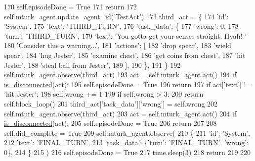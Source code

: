 \begin{DoxyCode}
170                 self.episodeDone = \textcolor{keyword}{True}
171                 \textcolor{keywordflow}{return}
172         self.mturk\_agent.update\_agent\_id(\textcolor{stringliteral}{'TestAct'})
173         third\_act = \{
174             \textcolor{stringliteral}{'id'}: \textcolor{stringliteral}{'System'},
175             \textcolor{stringliteral}{'text'}: \textcolor{stringliteral}{'THIRD\_TURN'},
176             \textcolor{stringliteral}{'task\_data'}: \{
177                 \textcolor{stringliteral}{'wrong'}: 0,
178                 \textcolor{stringliteral}{'turn'}: \textcolor{stringliteral}{'THIRD\_TURN'},
179                 \textcolor{stringliteral}{'text'}: \textcolor{stringliteral}{'You gotta get your senses straight. Hyah! '}
180                 \textcolor{stringliteral}{'Consider this a warning...'},
181                 \textcolor{stringliteral}{'actions'}: [
182                     \textcolor{stringliteral}{'drop spear'},
183                     \textcolor{stringliteral}{'wield spear'},
184                     \textcolor{stringliteral}{'hug Jester'},
185                     \textcolor{stringliteral}{'examine chest'},
186                     \textcolor{stringliteral}{'get coins from chest'},
187                     \textcolor{stringliteral}{'hit Jester'},
188                     \textcolor{stringliteral}{'steal ball from Jester'},
189                 ],
190             \},
191         \}
192         self.mturk\_agent.observe(third\_act)
193         act = self.mturk\_agent.act()
194         \textcolor{keywordflow}{if} \hyperlink{namespacelight__chats_1_1worlds_a43b0aff73307cda95a089763b77f40d3}{is\_disconnected}(act):
195             self.episodeDone = \textcolor{keyword}{True}
196             \textcolor{keywordflow}{return}
197         \textcolor{keywordflow}{if} act[\textcolor{stringliteral}{'text'}] != \textcolor{stringliteral}{'hit Jester'}:
198             self.wrong += 1
199             \textcolor{keywordflow}{if} self.wrong > 3:
200                 \textcolor{keywordflow}{return} self.block\_loop()
201             third\_act[\textcolor{stringliteral}{'task\_data'}][\textcolor{stringliteral}{'wrong'}] = self.wrong
202             self.mturk\_agent.observe(third\_act)
203             act = self.mturk\_agent.act()
204             \textcolor{keywordflow}{if} \hyperlink{namespacelight__chats_1_1worlds_a43b0aff73307cda95a089763b77f40d3}{is\_disconnected}(act):
205                 self.episodeDone = \textcolor{keyword}{True}
206                 \textcolor{keywordflow}{return}
207 
208         self.did\_complete = \textcolor{keyword}{True}
209         self.mturk\_agent.observe(
210             \{
211                 \textcolor{stringliteral}{'id'}: \textcolor{stringliteral}{'System'},
212                 \textcolor{stringliteral}{'text'}: \textcolor{stringliteral}{'FINAL\_TURN'},
213                 \textcolor{stringliteral}{'task\_data'}: \{\textcolor{stringliteral}{'turn'}: \textcolor{stringliteral}{'FINAL\_TURN'}, \textcolor{stringliteral}{'wrong'}: 0\},
214             \}
215         )
216         self.episodeDone = \textcolor{keyword}{True}
217         time.sleep(3)
218         \textcolor{keywordflow}{return}
219 
220 
\end{DoxyCode}


